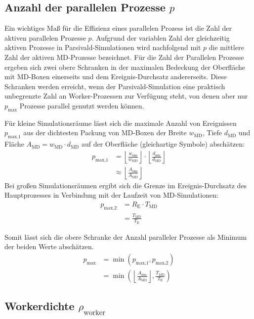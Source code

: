 \subsection{Anzahl der parallelen Prozesse $p$}

Ein wichtiges Maß für die Effizienz eines parallelen Prozess ist die Zahl der aktiven parallelen Prozesse $p$.
Aufgrund der variablen Zahl der gleichzeitig aktiven Prozesse in Parsivald-Simulationen wird nachfolgend mit $p$ die mittlere Zahl der aktiven MD-Prozesse bezeichnet.
Für die Zahl der Parallelen Prozesse ergeben sich zwei obere Schranken in der maximalen Bedeckung der Oberfläche mit MD-Boxen einerseits und dem Ereignis-Durchsatz andererseits.
Diese Schranken werden erreicht, wenn der Parsivald-Simulation eine praktisch unbegrenzte Zahl an Worker-Prozessen zur Verfügung steht, von denen aber nur $p_\text{max}$ Prozesse parallel genutzt werden können.

Für kleine Simulationsräume lässt sich die maximale Anzahl von Ereignissen $p_\text{max,1}$ aus der dichtesten Packung von MD-Boxen der Breite $w_\text{MD}$, Tiefe $d_\text{MD}$ und Fläche $A_\text{MD} = w_\text{MD} \cdot d_\text{MD}$ auf der Oberfläche (gleichartige Symbole) abschätzen:
\begin{align}
  p_\text{max,1} & = \left\lfloor\frac{w_\text{sim}}{w_\text{MD}}\right\rfloor \cdot \left\lfloor\frac{d_\text{sim}}{d_\text{MD}}\right\rfloor \\
  & \approx \left\lfloor\frac{A_\text{sim}}{A_\text{MD}}\right\rfloor
\end{align}
Bei großen Simulationsräumen ergibt sich die Grenze im Ereignis-Durchsatz des Hauptprozesses in Verbindung mit der Laufzeit von MD-Simulationen:
\begin{align}
  p_\text{max,2} & = R_\text{E} \cdot T_\text{MD} \\
                 & = \frac{T_\text{MD}}{T_\text{E}}
\end{align}

Somit lässt sich die obere Schranke der Anzahl paralleler Prozesse als Minimum der beiden Werte abschätzen.
\begin{align}
  p_\text{max} & = \min(p_\text{max,1}, p_\text{max,2}) \\
  & = \min\left(\left\lfloor\frac{A_\text{sim}}{A_\text{MD}}\right\rfloor, \frac{T_\text{MD}}{T_\text{E}}\right)
\end{align}

\subsection{Workerdichte $\rho_\text{worker}$}

